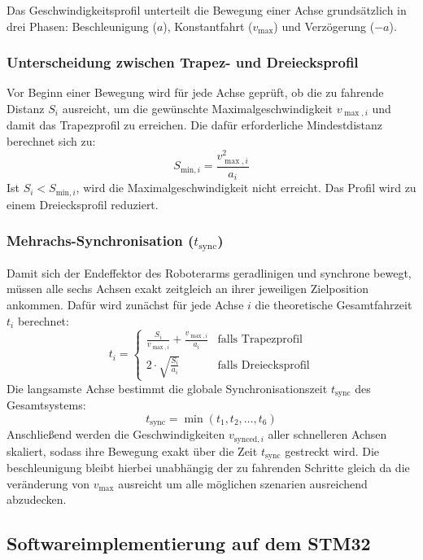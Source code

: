 Das Geschwindigkeitsprofil unterteilt die Bewegung einer Achse grundsätzlich in drei Phasen: Beschleunigung ($a$), Konstantfahrt ($v_{\max}$) und Verzögerung ($-a$). 

\subsubsection{Unterscheidung zwischen Trapez- und Dreiecksprofil}
Vor Beginn einer Bewegung wird für jede Achse geprüft, ob die zu fahrende Distanz $S_i$ ausreicht, um die gewünschte Maximalgeschwindigkeit $v_{\max, i}$ und damit das Trapezprofil zu erreichen. Die dafür erforderliche Mindestdistanz berechnet sich zu:
\begin{equation}
	S_{\text{min}, i} = \frac{v_{\max, i}^2}{a_i}
\end{equation}
Ist $S_i < S_{\text{min}, i}$, wird die Maximalgeschwindigkeit nicht erreicht. Das Profil wird zu einem Dreiecksprofil reduziert.
\subsubsection{Mehrachs-Synchronisation ($t_{\text{sync}}$)}
Damit sich der Endeffektor des Roboterarms geradlinigen und synchrone bewegt, müssen alle sechs Achsen exakt zeitgleich an ihrer jeweiligen Zielposition ankommen. Dafür wird zunächst für jede Achse $i$ die theoretische Gesamtfahrzeit $t_i$ berechnet:
\begin{equation}
	t_i = 
	\begin{cases} 
		\frac{S_i}{v_{\max, i}} + \frac{v_{\max, i}}{a_i} & \text{falls Trapezprofil} \\[6pt]
		2 \cdot \sqrt{\frac{S_i}{a_i}} & \text{falls Dreiecksprofil}
	\end{cases}
\end{equation}
Die langsamste Achse bestimmt die globale Synchronisationszeit $t_{\text{sync}}$ des Gesamtsystems:
\begin{equation}
	t_{\text{sync}} = \min(t_1, t_2, \dots, t_6)
\end{equation}
Anschließend werden die Geschwindigkeiten $v_{\text{synced}, i}$ aller schnelleren Achsen skaliert, sodass ihre Bewegung exakt über die Zeit $t_{\text{sync}}$ gestreckt wird. Die beschleunigung bleibt hierbei unabhängig der zu fahrenden Schritte gleich da die veränderung von  $v_{\text{max}}$ ausreicht um alle möglichen szenarien ausreichend abzudecken.

\subsection{Softwareimplementierung auf dem STM32}
\label{subsec:sw_implementation}

